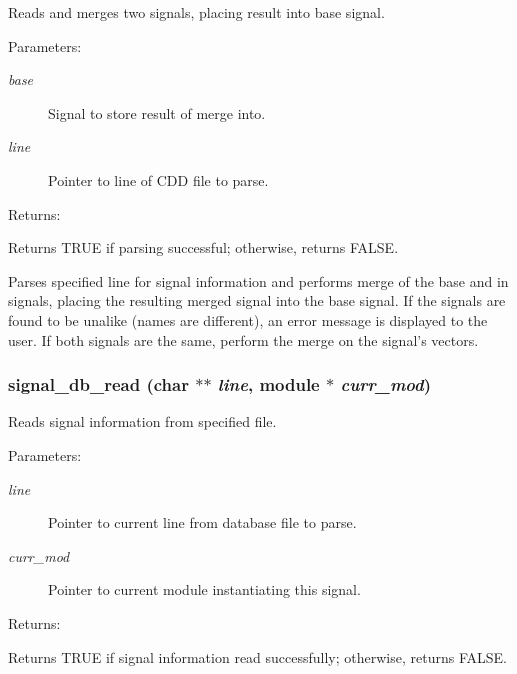 Reads and merges two signals, placing result into base signal.

\begin{Desc}
\item[Parameters: ]\par
\begin{description}
\item[{\em 
base}]Signal to store result of merge into. \item[{\em 
line}]Pointer to line of CDD file to parse.\end{description}
\end{Desc}
\begin{Desc}
\item[Returns: ]\par
Returns TRUE if parsing successful; otherwise, returns FALSE.\end{Desc}
Parses specified line for signal information and performs merge  of the base and in signals, placing the resulting merged signal  into the base signal. If the signals are found to be unalike  (names are different), an error message is displayed to the user.  If both signals are the same, perform the merge on the signal's  vectors. 
\subsubsection{ signal\_\-db\_\-read (char $\ast$$\ast$ {\em line}, {\bf module} $\ast$ {\em curr\_\-mod})}\label{signal_8c_a4}


Reads signal information from specified file.

\begin{Desc}
\item[Parameters: ]\par
\begin{description}
\item[{\em 
line}]Pointer to current line from database file to parse. \item[{\em 
curr\_\-mod}]Pointer to current module instantiating this signal.\end{description}
\end{Desc}
\begin{Desc}
\item[Returns: ]\par
Returns TRUE if signal information read successfully; otherwise, returns FALSE.\end{Desc}



